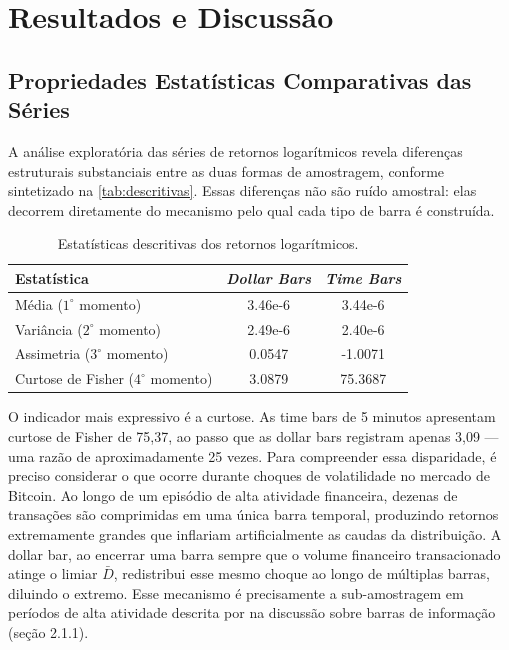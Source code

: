 
\chapter{Resultados e Discussão}
\label{cap:resultados}

\section{Propriedades Estatísticas Comparativas das Séries}
\label{sec:prop_estatisticas}

A análise exploratória das séries de retornos logarítmicos revela diferenças estruturais
substanciais entre as duas formas de amostragem, conforme sintetizado na \autoref{tab:descritivas}.
Essas diferenças não são ruído amostral: elas decorrem diretamente do mecanismo pelo qual
cada tipo de barra é construída.

\begin{table}[H]
\centering
\caption{Estatísticas descritivas dos retornos logarítmicos.}
\label{tab:descritivas}
\begin{tabular}{lSS}
\toprule
{Estatística} & {\emph{Dollar Bars}} & {\emph{Time Bars}} \\
\midrule
Média ($1^{\circ}$ momento)        &  3.46e-6  &  3.44e-6  \\
Variância ($2^{\circ}$ momento)    &  2.49e-6  &  2.40e-6  \\
Assimetria ($3^{\circ}$ momento)   &  0.0547   & -1.0071   \\
Curtose de Fisher ($4^{\circ}$ momento) &  3.0879   &  75.3687  \\
\bottomrule
\end{tabular}
\end{table}

O indicador mais expressivo é a curtose. As time bars de 5 minutos apresentam curtose de Fisher
de 75,37, ao passo que as dollar bars registram apenas 3,09 — uma razão de aproximadamente
25 vezes. Para compreender essa disparidade, é preciso considerar o que ocorre durante
choques de volatilidade no mercado de Bitcoin. Ao longo de um episódio de alta atividade
financeira, dezenas de transações são comprimidas em uma única barra temporal, produzindo
retornos extremamente grandes que inflariam artificialmente as caudas da distribuição.
A dollar bar, ao encerrar uma barra sempre que o volume financeiro transacionado atinge o
limiar $\bar{D}$, redistribui esse mesmo choque ao longo de múltiplas barras, diluindo o
extremo. Esse mecanismo é precisamente a sub-amostragem em períodos de alta atividade
descrita por  na discussão sobre barras de informação (seção 2.1.1).

